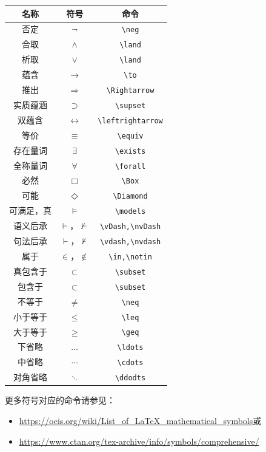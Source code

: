 \documentclass[UTF8,12pt]{article} %
\theoremstyle{definition}
\begin{document}
\begin{center}
\begin{tabular}{|c|c|c|}
\hline
名称      & 符号                   & 命令 \\
\hline
否定      & $\neg$                & \verb|\neg| \\
合取      & $\land$               & \verb|\land| \\
析取      & $\lor$                & \verb|\land| \\
蕴含      & $\to$                 & \verb|\to| \\
推出      & $\Rightarrow$         & \verb|\Rightarrow| \\
实质蕴涵   & $\supset$             & \verb|\supset| \\
双蕴含     & $\leftrightarrow$     & \verb|\leftrightarrow| \\
等价      & $\equiv$              & \verb|\equiv| \\
存在量词   & $\exists$             & \verb|\exists| \\
全称量词   & $\forall$             & \verb|\forall| \\
必然      & $\Box$                & \verb|\Box| \\
可能      & $\Diamond$            & \verb|\Diamond| \\
可满足，真  & $\models$            & \verb|\models| \\
语义后承   & $\vDash$，$\nvDash$   & \verb|\vDash,\nvDash| \\
句法后承   & $\vdash$，$\nvdash$   & \verb|\vdash,\nvdash| \\
属于      & $\in$，$\notin$       & \verb|\in,\notin| \\
真包含于   & $\subset$             & \verb|\subset| \\
包含于     & $\subset$            & \verb|\subset| \\
不等于     & $\neq$               & \verb|\neq| \\
小于等于   & $\leq$               & \verb|\leq| \\
大于等于   & $\geq$               & \verb|\geq| \\
下省略    & $\ldots$              & \verb|\ldots| \\
中省略    & $\cdots$              & \verb|\cdots| \\
对角省略  & $\ddots$              & \verb|\ddodts| \\
\hline 
\end{tabular}
\end{center}
更多符号对应的命令请参见：
\begin{itemize}
  \item \url{https://oeis.org/wiki/List_of_LaTeX_mathematical_symbols}或
  \item \url{https://www.ctan.org/tex-archive/info/symbols/comprehensive/}
\end{itemize}
\end{document}
